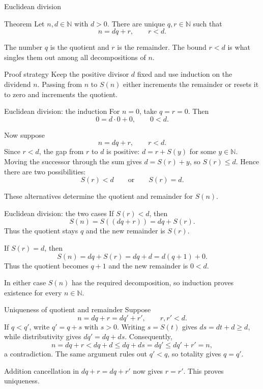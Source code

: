 \documentclass[aspectratio=169,11pt]{beamer}
\newcommand{\N}{\mathbb N}
\newcommand{\suc}[1]{S(#1)}
\begin{document}
\begin{frame}{Euclidean division}
  \begin{block}{Theorem}
    Let \(n,d\in\N\) with \(d>0\).  There are unique \(q,r\in\N\) such that
    \[
      \boxed{n=dq+r,\qquad r<d.}
    \]
  \end{block}

  The number \(q\) is the quotient and \(r\) is the remainder.  The bound
  \(r<d\) is what singles them out among all decompositions of \(n\).

  \begin{alertblock}{Proof strategy}
    Keep the positive divisor \(d\) fixed and use induction on the dividend
    \(n\).  Passing from \(n\) to \(\suc n\) either increments the remainder
    or resets it to zero and increments the quotient.
  \end{alertblock}
\end{frame}

\begin{frame}{Euclidean division: the induction}
  For \(n=0\), take \(q=r=0\).  Then
  \[
    0=d\cdot0+0,
    \qquad
    0<d.
  \]

  Now suppose
  \[
    n=dq+r,
    \qquad
    r<d.
  \]
  Since \(r<d\), the gap from \(r\) to \(d\) is positive: \(d=r+\suc y\)
  for some \(y\in\N\).  Moving the successor through the sum gives
  \(d=\suc r+y\), so \(\suc r\le d\).  Hence there are two possibilities:
  \[
    \suc r<d
    \qquad\text{or}\qquad
    \suc r=d.
  \]

  These alternatives determine the quotient and remainder for \(\suc n\).
\end{frame}

\begin{frame}{Euclidean division: the two cases}
  If \(\suc r<d\), then
  \[
    \suc n
      =\suc{(dq+r)}
      =dq+\suc r.
  \]
  Thus the quotient stays \(q\) and the new remainder is \(\suc r\).

  If \(\suc r=d\), then
  \[
    \suc n
      =dq+\suc r
      =dq+d
      =d(q+1)+0.
  \]
  Thus the quotient becomes \(q+1\) and the new remainder is \(0<d\).

  In either case \(\suc n\) has the required decomposition, so induction
  proves existence for every \(n\in\N\).
\end{frame}

\begin{frame}{Uniqueness of quotient and remainder}
  Suppose
  \[
    n=dq+r=dq'+r',
    \qquad
    r,r'<d.
  \]
  If \(q<q'\), write \(q'=q+s\) with \(s>0\).  Writing \(s=\suc t\) gives
  \(ds=dt+d\ge d\), while distributivity gives \(dq'=dq+ds\).  Consequently,
  \[
    n=dq+r<dq+d\le dq+ds=dq'\le dq'+r'=n,
  \]
  a contradiction.  The same argument rules out \(q'<q\), so totality gives
  \(q=q'\).

  Addition cancellation in \(dq+r=dq+r'\) now gives \(r=r'\).  This proves
  uniqueness.
\end{frame}
\end{document}

